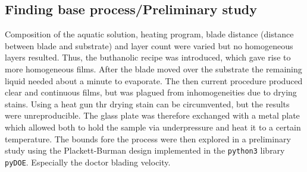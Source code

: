 \documentclass[a4paper]{article}
\newcommand{\todo}[1]{\textbf{\textcolor{red}{#1}}}
\newcommand{\td}[1]{\textcolor{red}{#1}}
\begin{document}
\subsection{Finding base process/Preliminary study}
Composition of the aquatic solution, heating program, blade distance (distance between blade and substrate) and layer count were varied but no homogeneous layers resulted. 
Thus, 
the buthanolic recipe was introduced, which gave rise to more homogeneous films.
After the blade moved over the substrate the remaining liquid needed about a minute 
to evaporate. 
The then current procedure produced clear and continuous films, but was plagued from 
inhomogeneities due to drying stains. 
Using a heat gun thr drying stain can be circumvented, but the results were unreproducible. 
The glass plate was therefore exchanged with a metal plate which allowed both to hold 
the sample via underpressure and heat it to a certain temperature.
The bounds fore the process were then explored in a preliminary study using the 
Plackett-Burman \cite{Plackett1946} design implemented in the \texttt{python3} library 
\texttt{pyDOE}.
Especially the doctor blading velocity.
\end{document}
